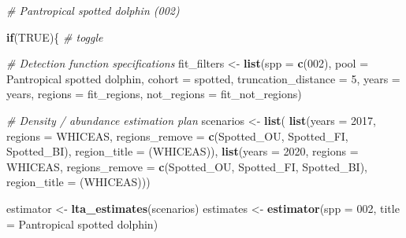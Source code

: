 \documentclass[
]{book}
\newenvironment{Shaded}{\begin{snugshade}}{\end{snugshade}}
\newcommand{\AttributeTok}[1]{\textcolor[rgb]{0.13,0.29,0.53}{#1}}
\newcommand{\CommentTok}[1]{\textcolor[rgb]{0.56,0.35,0.01}{\textit{#1}}}
\newcommand{\ConstantTok}[1]{\textcolor[rgb]{0.56,0.35,0.01}{#1}}
\newcommand{\ControlFlowTok}[1]{\textcolor[rgb]{0.13,0.29,0.53}{\textbf{#1}}}
\newcommand{\DecValTok}[1]{\textcolor[rgb]{0.00,0.00,0.81}{#1}}
\newcommand{\FunctionTok}[1]{\textcolor[rgb]{0.13,0.29,0.53}{\textbf{#1}}}
\newcommand{\NormalTok}[1]{#1}
\newcommand{\OtherTok}[1]{\textcolor[rgb]{0.56,0.35,0.01}{#1}}
\newcommand{\StringTok}[1]{\textcolor[rgb]{0.31,0.60,0.02}{#1}}
\begin{document}
\begin{Shaded}
\begin{Highlighting}[]
\CommentTok{\# Pantropical spotted dolphin (002)}

\ControlFlowTok{if}\NormalTok{(}\ConstantTok{TRUE}\NormalTok{)\{ }\CommentTok{\# toggle}

  \CommentTok{\# Detection function specifications}
\NormalTok{  fit\_filters }\OtherTok{\textless{}{-}}
    \FunctionTok{list}\NormalTok{(}\AttributeTok{spp =} \FunctionTok{c}\NormalTok{(}\StringTok{\textquotesingle{}002\textquotesingle{}}\NormalTok{),}
         \AttributeTok{pool =} \StringTok{\textquotesingle{}Pantropical spotted dolphin\textquotesingle{}}\NormalTok{,}
         \AttributeTok{cohort =} \StringTok{\textquotesingle{}spotted\textquotesingle{}}\NormalTok{,}
         \AttributeTok{truncation\_distance =} \DecValTok{5}\NormalTok{,}
         \AttributeTok{years =}\NormalTok{ years,}
         \AttributeTok{regions =}\NormalTok{ fit\_regions,}
         \AttributeTok{not\_regions =}\NormalTok{ fit\_not\_regions)}

  \CommentTok{\# Density / abundance estimation plan}
\NormalTok{  scenarios }\OtherTok{\textless{}{-}} \FunctionTok{list}\NormalTok{(}
    \FunctionTok{list}\NormalTok{(}\AttributeTok{years =} \DecValTok{2017}\NormalTok{,}
       \AttributeTok{regions =} \StringTok{\textquotesingle{}WHICEAS\textquotesingle{}}\NormalTok{,}
       \AttributeTok{regions\_remove =} \FunctionTok{c}\NormalTok{(}\StringTok{\textquotesingle{}Spotted\_OU\textquotesingle{}}\NormalTok{, }\StringTok{\textquotesingle{}Spotted\_FI\textquotesingle{}}\NormalTok{, }\StringTok{\textquotesingle{}Spotted\_BI\textquotesingle{}}\NormalTok{),}
       \AttributeTok{region\_title =} \StringTok{\textquotesingle{}(WHICEAS)\textquotesingle{}}\NormalTok{),}
    \FunctionTok{list}\NormalTok{(}\AttributeTok{years =} \DecValTok{2020}\NormalTok{,}
       \AttributeTok{regions =} \StringTok{\textquotesingle{}WHICEAS\textquotesingle{}}\NormalTok{,}
       \AttributeTok{regions\_remove =} \FunctionTok{c}\NormalTok{(}\StringTok{\textquotesingle{}Spotted\_OU\textquotesingle{}}\NormalTok{, }\StringTok{\textquotesingle{}Spotted\_FI\textquotesingle{}}\NormalTok{, }\StringTok{\textquotesingle{}Spotted\_BI\textquotesingle{}}\NormalTok{),}
       \AttributeTok{region\_title =} \StringTok{\textquotesingle{}(WHICEAS)\textquotesingle{}}\NormalTok{))}
  
\NormalTok{  estimator }\OtherTok{\textless{}{-}} \FunctionTok{lta\_estimates}\NormalTok{(scenarios)}
\NormalTok{  estimates }\OtherTok{\textless{}{-}} \FunctionTok{estimator}\NormalTok{(}\AttributeTok{spp =} \StringTok{\textquotesingle{}002\textquotesingle{}}\NormalTok{, }\AttributeTok{title =} \StringTok{\textquotesingle{}Pantropical spotted dolphin\textquotesingle{}}\NormalTok{)}
  

\end{Highlighting}
\end{Shaded}
\end{document}
